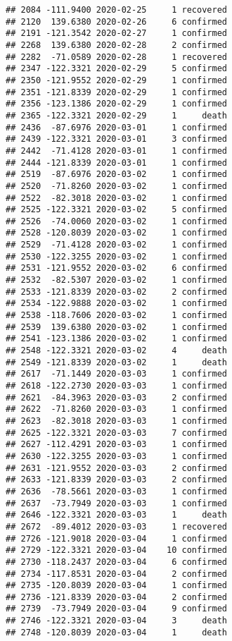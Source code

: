 \documentclass[
]{article}
\newenvironment{Shaded}{\begin{snugshade}}{\end{snugshade}}
\newcommand{\KeywordTok}[1]{\textcolor[rgb]{0.13,0.29,0.53}{\textbf{#1}}}
\newcommand{\NormalTok}[1]{#1}
\newcommand{\OperatorTok}[1]{\textcolor[rgb]{0.81,0.36,0.00}{\textbf{#1}}}
\newcommand{\StringTok}[1]{\textcolor[rgb]{0.31,0.60,0.02}{#1}}
\begin{document}
\begin{verbatim}
## 2084 -111.9400 2020-02-25     1 recovered
## 2120  139.6380 2020-02-26     6 confirmed
## 2191 -121.3542 2020-02-27     1 confirmed
## 2268  139.6380 2020-02-28     2 confirmed
## 2282  -71.0589 2020-02-28     1 recovered
## 2347 -122.3321 2020-02-29     5 confirmed
## 2350 -121.9552 2020-02-29     1 confirmed
## 2351 -121.8339 2020-02-29     1 confirmed
## 2356 -123.1386 2020-02-29     1 confirmed
## 2365 -122.3321 2020-02-29     1     death
## 2436  -87.6976 2020-03-01     1 confirmed
## 2439 -122.3321 2020-03-01     3 confirmed
## 2442  -71.4128 2020-03-01     1 confirmed
## 2444 -121.8339 2020-03-01     1 confirmed
## 2519  -87.6976 2020-03-02     1 confirmed
## 2520  -71.8260 2020-03-02     1 confirmed
## 2522  -82.3018 2020-03-02     1 confirmed
## 2525 -122.3321 2020-03-02     5 confirmed
## 2526  -74.0060 2020-03-02     1 confirmed
## 2528 -120.8039 2020-03-02     1 confirmed
## 2529  -71.4128 2020-03-02     1 confirmed
## 2530 -122.3255 2020-03-02     1 confirmed
## 2531 -121.9552 2020-03-02     6 confirmed
## 2532  -82.5307 2020-03-02     1 confirmed
## 2533 -121.8339 2020-03-02     2 confirmed
## 2534 -122.9888 2020-03-02     1 confirmed
## 2538 -118.7606 2020-03-02     1 confirmed
## 2539  139.6380 2020-03-02     1 confirmed
## 2541 -123.1386 2020-03-02     1 confirmed
## 2548 -122.3321 2020-03-02     4     death
## 2549 -121.8339 2020-03-02     1     death
## 2617  -71.1449 2020-03-03     1 confirmed
## 2618 -122.2730 2020-03-03     1 confirmed
## 2621  -84.3963 2020-03-03     2 confirmed
## 2622  -71.8260 2020-03-03     1 confirmed
## 2623  -82.3018 2020-03-03     1 confirmed
## 2625 -122.3321 2020-03-03     7 confirmed
## 2627 -112.4291 2020-03-03     1 confirmed
## 2630 -122.3255 2020-03-03     1 confirmed
## 2631 -121.9552 2020-03-03     2 confirmed
## 2633 -121.8339 2020-03-03     2 confirmed
## 2636  -78.5661 2020-03-03     1 confirmed
## 2637  -73.7949 2020-03-03     1 confirmed
## 2646 -122.3321 2020-03-03     1     death
## 2672  -89.4012 2020-03-03     1 recovered
## 2726 -121.9018 2020-03-04     1 confirmed
## 2729 -122.3321 2020-03-04    10 confirmed
## 2730 -118.2437 2020-03-04     6 confirmed
## 2734 -117.8531 2020-03-04     2 confirmed
## 2735 -120.8039 2020-03-04     1 confirmed
## 2736 -121.8339 2020-03-04     2 confirmed
## 2739  -73.7949 2020-03-04     9 confirmed
## 2746 -122.3321 2020-03-04     3     death
## 2748 -120.8039 2020-03-04     1     death
\end{verbatim}

\begin{Shaded}
\end{Shaded}
\end{document}
